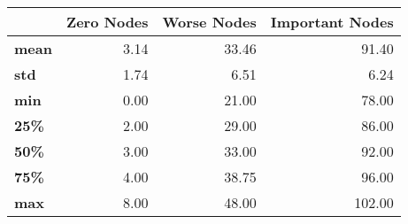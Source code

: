 \begin{tabular}{lrrr}
\toprule
{} &  Zero Nodes &  Worse Nodes &  Important Nodes \\
\midrule
\textbf{mean} &        3.14 &        33.46 &            91.40 \\
\textbf{std } &        1.74 &         6.51 &             6.24 \\
\textbf{min } &        0.00 &        21.00 &            78.00 \\
\textbf{25\% } &        2.00 &        29.00 &            86.00 \\
\textbf{50\% } &        3.00 &        33.00 &            92.00 \\
\textbf{75\% } &        4.00 &        38.75 &            96.00 \\
\textbf{max } &        8.00 &        48.00 &           102.00 \\
\bottomrule
\end{tabular}
